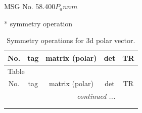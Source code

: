 \documentclass[fleqn,8pt]{jsarticle}
\begin{document}
\setcounter{MaxMatrixCols}{32}

\renewcommand{\tablename}{Table~}
\renewcommand{\figurename}{Figure~}
\begin{center}
\LARGE
MSG No. 58.400\quad$P_{a}nnm$
\end{center}
* symmetry operation
\renewcommand{\arraystretch}{1.3}
\begin{longtable}{ccccc}
\caption{Symmetry operations for 3d polar vector.}
 \\
 \hline \hline
No. & tag & matrix (polar) & det & TR \\ \hline \endfirsthead

\multicolumn{4}{l}{\tablename\ \thetable{}} \\
 \hline \hline
No. & tag & matrix (polar) & det & TR \\ \hline \endhead

 \hline \hline
\multicolumn{4}{r}{\footnotesize\it continued ...} \\ \endfoot

 \hline \hline
\multicolumn{4}{r}{} \\ \endlastfoot


\end{longtable}
\end{document}
